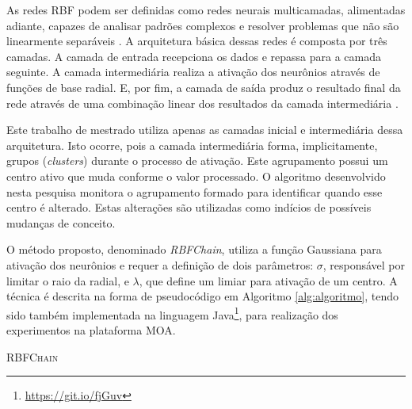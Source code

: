 \documentclass[msc, classic, a4paper]{ufbathesis}
\begin{document}
As redes RBF podem ser definidas como redes neurais multicamadas, alimentadas adiante, capazes de analisar padrões complexos e resolver problemas que não são linearmente separáveis \cite{Braga:RedesNeuraisTeoriaAplicacoes}.
A arquitetura básica dessas redes é composta por três camadas.
A camada de entrada recepciona os dados e repassa para a camada seguinte.
A camada intermediária realiza a ativação dos neurônios através de funções de base radial.
E, por fim, a camada de saída produz o resultado final da rede através de uma combinação linear dos resultados da camada intermediária \cite{Rojas:1996:NNS:235222}.

Este trabalho de mestrado utiliza apenas as camadas inicial e intermediária dessa arquitetura.
Isto ocorre, pois a camada intermediária forma, implicitamente, grupos (\textit{clusters}) durante o processo de ativação.
Este agrupamento possui um centro ativo que muda conforme o valor processado.
O algoritmo desenvolvido nesta pesquisa monitora o agrupamento formado para identificar quando esse centro é alterado.
Estas alterações são utilizadas como indícios de possíveis mudanças de conceito.

O método proposto, denominado \textit{RBFChain}, utiliza a função Gaussiana para ativação dos neurônios e requer a definição de dois parâmetros:
\textit{$\sigma$}, responsável por limitar o raio da radial, e \textit{$\lambda$}, que define um limiar para ativação de um centro.
A técnica é descrita na forma de pseudocódigo em Algoritmo \ref{alg:algoritmo},
tendo sido também implementada na linguagem Java\footnote{\url{https://git.io/fjGuv}}, para realização dos experimentos na plataforma MOA.

\vspace{7pt}
\begin{algorithm}[H]
    \SetAlgoLined

    \caption{\textsc{RBFChain}}
    \label{alg:algoritmo}
\end{algorithm}
\vspace{7pt}
\end{document}
